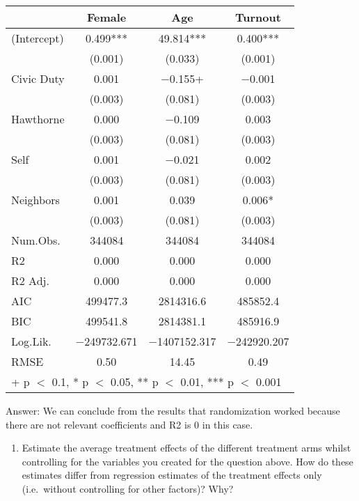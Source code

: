 \documentclass[
]{article}
\providecommand{\tightlist}{%
  \setlength{\itemsep}{0pt}\setlength{\parskip}{0pt}}
\begin{document}
\begin{table}
\centering
\begin{tabular}[t]{lccc}
\toprule
  & Female & Age & Turnout\\
\midrule
(Intercept) & \num{0.499}*** & \num{49.814}*** & \num{0.400}***\\
 & (\num{0.001}) & (\num{0.033}) & (\num{0.001})\\
Civic Duty & \num{0.001} & \num{-0.155}+ & \num{-0.001}\\
 & (\num{0.003}) & (\num{0.081}) & \vphantom{3} (\num{0.003})\\
Hawthorne & \num{0.000} & \num{-0.109} & \num{0.003}\\
 & (\num{0.003}) & (\num{0.081}) & \vphantom{2} (\num{0.003})\\
Self & \num{0.001} & \num{-0.021} & \num{0.002}\\
 & (\num{0.003}) & (\num{0.081}) & \vphantom{1} (\num{0.003})\\
Neighbors & \num{0.001} & \num{0.039} & \num{0.006}*\\
 & (\num{0.003}) & (\num{0.081}) & (\num{0.003})\\
\midrule
Num.Obs. & \num{344084} & \num{344084} & \num{344084}\\
R2 & \num{0.000} & \num{0.000} & \num{0.000}\\
R2 Adj. & \num{0.000} & \num{0.000} & \num{0.000}\\
AIC & \num{499477.3} & \num{2814316.6} & \num{485852.4}\\
BIC & \num{499541.8} & \num{2814381.1} & \num{485916.9}\\
Log.Lik. & \num{-249732.671} & \num{-1407152.317} & \num{-242920.207}\\
RMSE & \num{0.50} & \num{14.45} & \num{0.49}\\
\bottomrule
\multicolumn{4}{l}{\rule{0pt}{1em}+ p $<$ 0.1, * p $<$ 0.05, ** p $<$ 0.01, *** p $<$ 0.001}\\
\end{tabular}
\end{table}

Answer: We can conclude from the results that randomization worked
because there are not relevant coefficients and R2 is 0 in this case.

\begin{enumerate}
\def\labelenumi{\arabic{enumi}.}
\setcounter{enumi}{3}
\tightlist
\item
  Estimate the average treatment effects of the different treatment arms
  whilst controlling for the variables you created for the question
  above. How do these estimates differ from regression estimates of the
  treatment effects only (i.e.~without controlling for other factors)?
  Why?
\end{enumerate}
\end{document}
